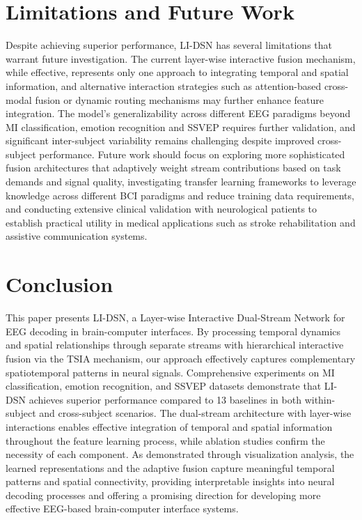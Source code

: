 \documentclass[journal]{IEEEtran}
\theoremstyle{plain}
\begin{document}
\section{Limitations and Future Work}
Despite achieving superior performance, LI-DSN has several limitations that warrant future investigation. The current layer-wise interactive fusion mechanism, while effective, represents only one approach to integrating temporal and spatial information, and alternative interaction strategies such as attention-based cross-modal fusion or dynamic routing mechanisms may further enhance feature integration. The model's generalizability across different EEG paradigms beyond MI classification, emotion recognition and SSVEP requires further validation, and significant inter-subject variability remains challenging despite improved cross-subject performance. Future work should focus on exploring more sophisticated fusion architectures that adaptively weight stream contributions based on task demands and signal quality, investigating transfer learning frameworks to leverage knowledge across different BCI paradigms and reduce training data requirements, and conducting extensive clinical validation with neurological patients to establish practical utility in medical applications such as stroke rehabilitation and assistive communication systems.

\section{Conclusion}
This paper presents LI-DSN, a Layer-wise Interactive Dual-Stream Network for EEG decoding in brain-computer interfaces. By processing temporal dynamics and spatial relationships through separate streams with hierarchical interactive fusion via the TSIA mechanism, our approach effectively captures complementary spatiotemporal patterns in neural signals. Comprehensive experiments on MI classification, emotion recognition, and SSVEP datasets demonstrate that LI-DSN achieves superior performance compared to 13 baselines in both within-subject and cross-subject scenarios. The dual-stream architecture with layer-wise interactions enables effective integration of temporal and spatial information throughout the feature learning process, while ablation studies confirm the necessity of each component. As demonstrated through visualization analysis, the learned representations and the adaptive fusion capture meaningful temporal patterns and spatial connectivity, providing interpretable insights into neural decoding processes and offering a promising direction for developing more effective EEG-based brain-computer interface systems.

 
 
\end{document}
